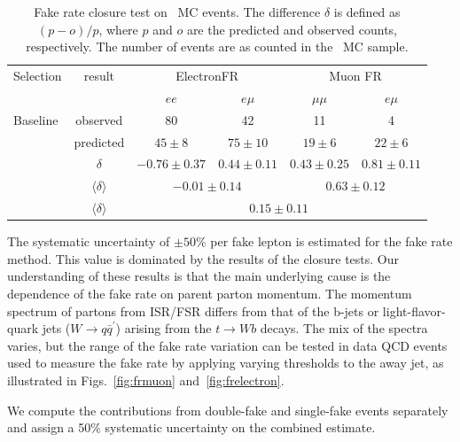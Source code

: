 \begin{table}[h]
\begin{center}
\begin{tabular}{lc|cc|cc}
\hline\hline
Selection	& result	&	\multicolumn{2}{|c}{ElectronFR}		& \multicolumn{2}{|c}{Muon FR}	\\
		&				&	$ee$		& $e\mu$		& $\mu\mu$	& $e\mu$	\\\hline
Baseline	&	observed		& 80			& 42			& 11		& 4		\\
		&predicted			& $45\pm8$		& $75\pm10$		& $19\pm 6$	& $22\pm6$	\\ 
		& $\delta$			& $-0.76\pm 0.37$	& $0.44\pm0.11$		& $0.43\pm0.25$	& $0.81\pm0.11$	\\ 
		& $\langle \delta \rangle$	& \multicolumn{2}{|c}{$-0.01\pm0.14$}		& \multicolumn{2}{|c}{$0.63\pm0.12$} \\
		& $\langle \delta \rangle$	& 		\multicolumn{4}{|c}{$0.15\pm 0.11$}				\\ \hline
\hline
\end{tabular}
\caption{\label{tab:ttclosure}Fake rate closure test on \ttbar\ MC events.
The difference $\delta$ is defined as $(p-o)/p$, where $p$ and $o$ are the predicted
and observed counts, respectively.
The number of events are as counted in the \ttbar\ MC sample.}
\end{center}
\end{table}

\newcommand{\nNoNu}{\ensuremath{N_{{n}\overline{n}}}}
\newcommand{\nNoNo}{\ensuremath{N_{\overline{n}\overline{n}}}}
\newcommand{\nNuNu}{\ensuremath{N_{{n}{n}}}}

The systematic uncertainty of $\pm 50\%$ per fake lepton is estimated for the fake rate method.
This value is dominated by the results of the closure tests.
Our understanding of these results is that the main underlying cause is 
the dependence of the fake rate on parent parton momentum.
The momentum spectrum of partons from ISR/FSR differs from that of the b-jets
or light-flavor-quark jets ($W\to q\bar{q}^\prime$) arising from the $t\to W b$ decays.
The mix of the spectra varies, but the range of the fake rate variation
can be tested in data QCD events used to measure the fake rate
by applying varying thresholds to the away jet, as illustrated in Figs.~\ref{fig:frmuon} and~\ref{fig:frelectron}.

We compute the contributions from double-fake and single-fake events separately and assign a 50\% systematic
uncertainty on the combined estimate.

